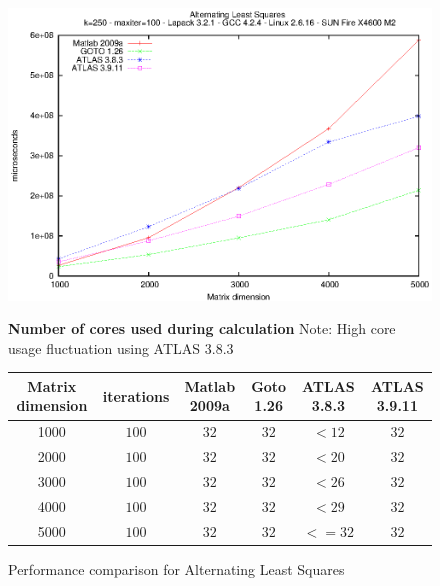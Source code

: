 \documentclass[a4paper,10pt]{scrartcl}
\begin{document}
	\begin{figure}
		\label{Figure2}	
		\includegraphics{nmf_als.eps}\newline

		
		\textbf{Number of cores used during calculation}\newline
		Note: High core usage fluctuation using ATLAS 3.8.3\newline

		\begin{tabular}{|c|c|c|c|c|c|}
			\hline
			Matrix dimension & iterations & Matlab 2009a & Goto 1.26 & ATLAS 3.8.3 & ATLAS 3.9.11\\
			\hline
			1000 & $100$ & $32$ & $32$ & $<12$ & $32$\\
			2000 & $100$ & $32$ & $32$ & $<20$ & $32$ \\
			3000 & $100$ & $32$ & $32$ & $<26$ & $32$\\
			4000 & $100$ & $32$ & $32$ & $<29$ & $32$\\
			5000 & $100$ & $32$ & $32$ & $<=32$ & $32$\\
			\hline
		\end{tabular}
		\caption{Performance comparison for Alternating Least Squares}
	\end{figure}
\end{document}
